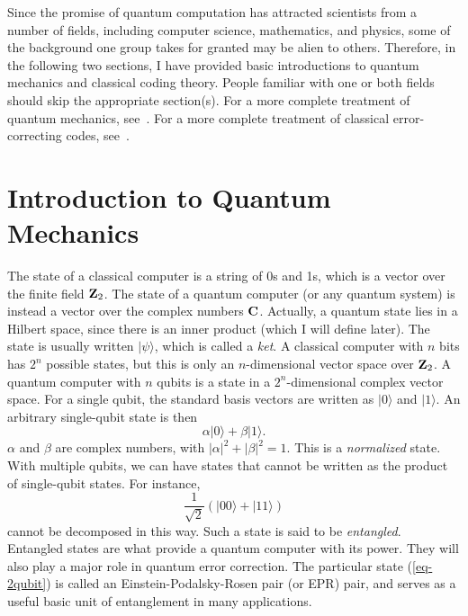 \documentclass{report}
\newcommand{\ket}[1]{|{#1}\rangle}
\begin{document}
Since the promise of quantum computation has attracted scientists from a 
number of fields, including computer science, mathematics, and physics, 
some of the background one group takes for granted may be alien to 
others.  Therefore, in the following two sections, I have provided basic 
introductions to quantum mechanics and classical coding theory.  People 
familiar with one or both fields should skip the appropriate section(s).  For 
a more complete treatment of quantum mechanics, 
see~\cite{cohen-tannoudji}.  For a more complete treatment of classical 
error-correcting codes, see~\cite{macwilliams-sloane}.

\section{Introduction to Quantum Mechanics}
\label{sec-QM}

The state of a classical computer is a string of 0s and 1s, which is a vector 
over the finite field ${\bf Z}_2$.  The state of a quantum computer (or any 
quantum system) is instead a vector over the complex numbers $\bf{C}$.
Actually, a quantum state lies in a Hilbert space, since there is an inner
product (which I will define later).  The state is usually written 
$\ket{\psi}$, which is called a {\em ket}.  A classical computer with $n$ 
bits has $2^n$ possible states, but this is only an $n$-dimensional vector 
space over ${\bf Z}_2$.  A quantum computer with $n$ qubits is a state in 
a $2^n$-dimensional complex vector space.  For a single qubit, the standard 
basis vectors are written as $\ket{0}$ and $\ket{1}$.  An arbitrary 
single-qubit state is then
\begin{equation}
\alpha \ket{0} + \beta \ket{1}.
\label{eq-1qubit}
\end{equation}
$\alpha$ and $\beta$ are complex numbers, with $|\alpha|^2 + |\beta|^2 = 
1$.  This is a {\em normalized} state.  With multiple qubits, we can have 
states that cannot be written as the product of single-qubit states.  For 
instance,
\begin{equation}
\frac{1}{\sqrt{2}} \left(\ket{00} + \ket{11} \right)
\label{eq-2qubit}
\end{equation}
cannot be decomposed in this way.  Such a state is said to be {\em 
entangled}.  Entangled states are what provide a quantum computer with 
its power.  They will also play a major role in quantum error correction.
The particular state (\ref{eq-2qubit}) is called an Einstein-Podalsky-Rosen
pair (or EPR) pair, and serves as a useful basic unit of entanglement in
many applications.
\end{document}
